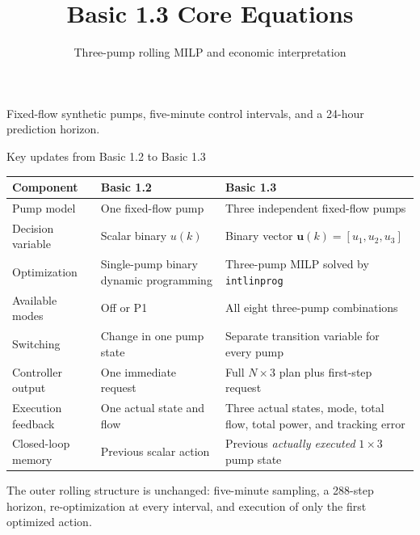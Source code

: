 \documentclass[t,12pt]{beamer}
\title{Basic 1.3 Core Equations}
\subtitle{Three-pump rolling MILP and economic interpretation}
\author{}
\date{}
\newcommand{\code}[1]{\texttt{#1}}
\begin{document}
\begin{frame}
  \titlepage
  \vspace{-1.4em}
  \begin{center}
    \small
    Fixed-flow synthetic pumps, five-minute control intervals, and a
    24-hour prediction horizon.
  \end{center}
\end{frame}

\begin{frame}{Key updates from Basic 1.2 to Basic 1.3}
\small
\begin{tabular}{>{\raggedright\arraybackslash}p{}
                >{\raggedright\arraybackslash}p{}
                >{\raggedright\arraybackslash}p{}}
\toprule
Component & Basic 1.2 & Basic 1.3 \\
\midrule
Pump model & One fixed-flow pump & Three independent fixed-flow pumps \\
Decision variable & Scalar binary $u(k)$ & Binary vector
  $\bm u(k)=[u_1,u_2,u_3]$ \\
Optimization & Single-pump binary dynamic programming &
  Three-pump MILP solved by \code{intlinprog} \\
Available modes & Off or P1 & All eight three-pump combinations \\
Switching & Change in one pump state & Separate transition variable for
  every pump \\
Controller output & One immediate request & Full $N\times3$ plan plus
  first-step request \\
Execution feedback & One actual state and flow & Three actual states,
  mode, total flow, total power, and tracking error \\
Closed-loop memory & Previous scalar action & Previous
  \emph{actually executed} $1\times3$ pump state \\
\bottomrule
\end{tabular}

\vspace{0.4em}
\small
The outer rolling structure is unchanged: five-minute sampling, a
288-step horizon, re-optimization at every interval, and execution of only
the first optimized action.
\end{frame}
\end{document}
